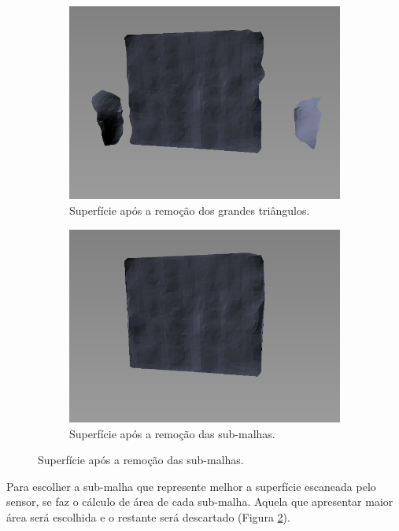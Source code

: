\begin{figure}[H]
\begin{subfigure}[t]{0.4\textwidth}
        \includegraphics[width=\textwidth]{dados/figuras/split_mesh3.png}
        \caption{Superfície após a remoção dos grandes triângulos.}
        \label{fig:split_mesh3}
    \end{subfigure}
    \begin{subfigure}[t]{0.4\textwidth}
        \includegraphics[width=\textwidth]{dados/figuras/split_mesh4.png}
        \caption{Superfície após a remoção das sub-malhas.}
        \label{fig:split_mesh4}
    \end{subfigure}
    \label{fig:split_mesh}
\end{figure}

Para escolher a sub-malha que represente melhor a superfície escaneada pelo sensor, se faz o cálculo de área de cada sub-malha.
Aquela que apresentar maior área será escolhida e o restante será descartado (Figura \ref{fig:split_mesh4}).


